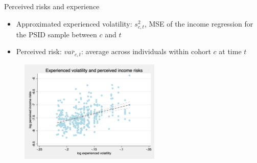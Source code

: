 \documentclass{beamer}
\begin{document}
\begin{frame}{Perceived risks and experience}
	\begin{itemize}
		\item Approximated experienced volatility: $s^2_{c,t}$, MSE of the income regression for the PSID sample between $c$ and $t$ 
		\item Perceived risk: $\overline{var_{c,t}}$: average across individuals within cohort $c$ at time $t$
	\end{itemize}
	\begin{figure}[ht]
		\label{ts_incvar_byear_g_mean}
		\centering
		\includegraphics[width=0.6\textwidth]{figures/experience_var_var_data.png}
	\end{figure}
\end{frame}
\end{document}
